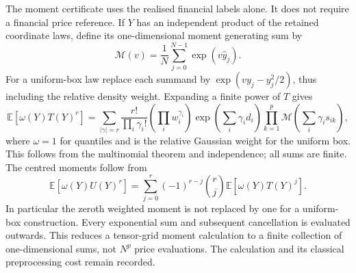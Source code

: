 The moment certificate uses the realised financial labels alone.  It does
not require a financial price reference.  If $Y$ has an independent product
of the retained coordinate laws, define its one-dimensional moment generating
sum by
\begin{equation}
 \mathcal M(v)=\frac1N\sum_{j=0}^{N-1}\exp(v\widehat y_j).
 \label{eq:iv-finite-mgf}
\end{equation}
For a uniform-box law replace each summand by
$\exp(vy_j-y_j^2/2)$, thus including the relative density weight.
Expanding a finite power of $T$ gives
\begin{equation}
 \mathbb E[\omega(Y)T(Y)^r]
 =\sum_{|\gamma|=r}\frac{r!}{\prod_i\gamma_i!}
    \left(\prod_iw_i^{\gamma_i}\right)
    \exp\!\left(\sum_i\gamma_id_i\right)
    \prod_{k=1}^p\mathcal M\!\left(\sum_i\gamma_is_{ik}\right),
 \label{eq:iv-finite-raw-moment}
\end{equation}
where $\omega=1$ for quantiles and is the relative Gaussian weight for the
uniform box.  This follows from the multinomial theorem and independence;
all sums are finite.  The centred moments follow from
\begin{equation}
 \mathbb E[\omega(Y)U(Y)^r]
 =\sum_{j=0}^r(-1)^{r-j}\binom rj
   \mathbb E[\omega(Y)T(Y)^j].
 \label{eq:iv-finite-centred-moment}
\end{equation}
In particular the zeroth weighted moment is not replaced by one for a
uniform-box construction.  Every exponential sum and subsequent cancellation
is evaluated outwards.  This reduces a tensor-grid moment calculation to a
finite collection of one-dimensional sums, not $N^p$ price evaluations.
The calculation and its classical preprocessing cost remain recorded.

